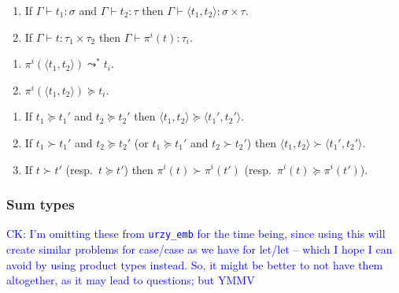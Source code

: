 \documentclass[runningheads,a4paper]{llncs}
\newcommand{\pair}[2]{\langle #1,#2 \rangle}
\newcommand{\flatten}{\mathtt{flatten}}
\newcommand{\lift}{\mathtt{lift}}
\newcommand{\proves}{\vdash}
\newcommand{\CK}[1]{\textcolor{blue}{CK: #1}}
\begin{document}
\begin{lemma}
  \begin{enumerate}
  \item If $\Gamma \proves t_1 : \sigma$ and $\Gamma \proves t_2 :
    \tau$ then $\Gamma \proves \pair{t_1}{t_2} : \sigma \times \tau$.
  \item If $\Gamma \proves t : \tau_1 \times \tau_2$ then $\Gamma
    \proves \pi^i(t) : \tau_i$.
  \end{enumerate}
\end{lemma}

\begin{lemma}
  \begin{enumerate}
  \item $\pi^i(\pair{t_1}{t_2}) \leadsto^* t_i %
    $.
  \item $\pi^i(\pair{t_1}{t_2}) \succeq t_i$.
  \end{enumerate}
\end{lemma}

\begin{lemma}
  \begin{enumerate}
  \item If $t_1 \succeq t_1'$ and $t_2 \succeq t_2'$ then
    $\pair{t_1}{t_2} \succeq \pair{t_1'}{t_2'}$.
  \item If $t_1 \succ t_1'$ and $t_2 \succeq t_2'$ (or $t_1 \succeq
    t_1'$ and $t_2 \succ t_2'$) then $\pair{t_1}{t_2} \succ
    \pair{t_1'}{t_2'}$.
  \item If $t \succ t'$ (resp.~$t \succeq t'$) then $\pi^i(t) \succ
    \pi^i(t')$ (resp.~$\pi^i(t)\succeq \pi^i(t')$).
  \end{enumerate}
\end{lemma}

\subsubsection{Sum types}
\CK{I'm omitting these from \texttt{urzy\_emb} for the time being,
since using this will create similar problems for case/case as we have
for let/let -- which I hope I can avoid by using product types instead.
So, it might be better to not have them altogether, as it may lead to
questions; but YMMV}
\end{document}
